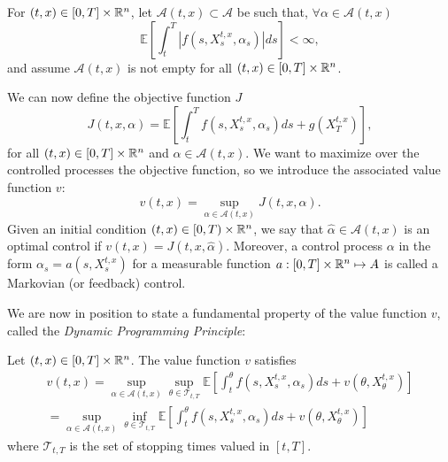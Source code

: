 For $(t,x) \in [0,T] \times \mathbb{R}^n$, let $\mathcal{A}(t,x) \subset \mathcal{A}$
be such that, $\forall \alpha \in \mathcal{A}(t,x)$
\begin{equation}
    \mathbb{E}\left[ \int_t^T | f(s, X_s^{t,x}, \alpha_s) | ds \right] < \infty,
\end{equation}
and assume $\mathcal{A}(t,x)$ is not empty for all
$(t,x) \in [0,T] \times \mathbb{R}^n$.

We can now define the objective function $J$
\begin{equation}
    J(t, x, \alpha) = \mathbb{E}\left[ \int_t^T f(s, X_s^{t,x}, \alpha_s) ds + g(X^{t,x}_T) \right],
\end{equation}
for all $(t,x) \in [0,T] \times \mathbb{R}^n$ and $\alpha \in \mathcal{A}(t,x)$.
We want to maximize over the controlled processes the objective function, so
we introduce the associated value function $v$:
\begin{equation}
    v(t,x) = \sup_{\alpha \in \mathcal{A}(t,x)} J(t,x,\alpha).
\end{equation}
Given an initial condition $(t,x) \in \left[ 0,T \right) \times \mathbb{R}^n$, we say
that $\hat \alpha \in \mathcal{A}(t,x)$ is an optimal control if
$v(t,x) = J(t,x,\hat \alpha)$.
Moreover, a control process $\alpha$ in the form $\alpha_s = a(s,X_s^{t,x})$ for
a measurable function $a: [0,T] \times \mathbb{R}^n \mapsto A$ is
called a Markovian (or feedback) control.

We are now in position to state a fundamental property of the value function $v$,
called the \textit{Dynamic Programming Principle}:

\begin{theorem}
    Let $(t,x) \in [0,T] \times \mathbb{R}^n$. The value function $v$ satisfies
\begin{gather} 
        v(t,x) = \sup_{\alpha \in \mathcal{A}(t,x)}
        \sup_{\theta \in \mathcal{T}_{t,T}}
        \mathbb{E}\left[ \int_t^\theta f(s, X_s^{t,x}, \alpha_s) ds + v(\theta, X^{t,x}_\theta) \right]\\
        =\sup_{\alpha \in \mathcal{A}(t,x)}
        \inf_{\theta \in \mathcal{T}_{t,T}}
        \mathbb{E}\left[ \int_t^\theta f(s, X_s^{t,x}, \alpha_s) ds + v(\theta, X^{t,x}_\theta) \right]
\end{gather}
    where $\mathcal{T}_{t, T}$ is the set of stopping times valued in $[t,T]$.
\end{theorem}

